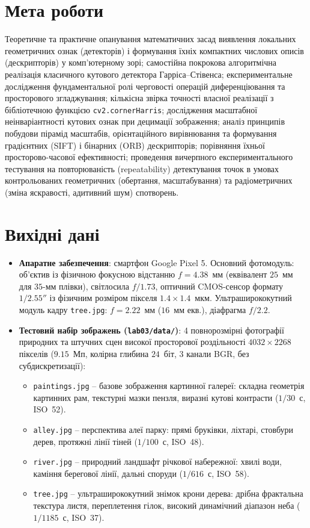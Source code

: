 \documentclass[14pt, a4paper]{extarticle}
\begin{document}


\section{Мета роботи}
Теоретичне та практичне опанування математичних засад виявлення локальних геометричних ознак (детекторів) і формування їхніх компактних числових описів (дескрипторів) у комп'ютерному зорі; самостійна покрокова алгоритмічна реалізація класичного кутового детектора Гарріса--Стівенса; експериментальне дослідження фундаментальної ролі черговості операцій диференціювання та просторового згладжування; кількісна звірка точності власної реалізації з бібліотечною функцією \texttt{cv2.cornerHarris}; дослідження масштабної неінваріантності кутових ознак при децимації зображення; аналіз принципів побудови пірамід масштабів, орієнтаційного вирівнювання та формування градієнтних (SIFT) і бінарних (ORB) дескрипторів; порівняння їхньої просторово-часової ефективності; проведення вичерпного експериментального тестування на повторюваність (repeatability) детектування точок в умовах контрольованих геометричних (обертання, масштабування) та радіометричних (зміна яскравості, адитивний шум) спотворень.

\section{Вихідні дані}
\begin{itemize}
    \item \textbf{Апаратне забезпечення}: смартфон Google Pixel 5. Основний фотомодуль: об'єктив із фізичною фокусною відстанню $f = 4.38$~мм (еквівалент $25$~мм для $35$-мм плівки), світлосила $f/1.73$, оптичний CMOS-сенсор формату $1/2.55''$ із фізичним розміром пікселя $1.4 \times 1.4$~мкм. Ультраширококутний модуль кадру \texttt{tree.jpg}: $f = 2.22$~мм ($16$~мм екв.), діафрагма $f/2.2$.
    \item \textbf{Тестовий набір зображень (\texttt{lab03/data/})}: 4 повнорозмірні фотографії природних та штучних сцен високої просторової роздільності $4032 \times 2268$ пікселів ($9.15$~Мп, колірна глибина $24$~біт, 3 канали BGR, без субдискретизації):
    \begin{itemize}
        \item \texttt{paintings.jpg} -- базове зображення картинної галереї: складна геометрія картинних рам, текстурні мазки пензля, виразні кутові контрасти ($1/30$~с, ISO~52).
        \item \texttt{alley.jpg} -- перспектива алеї парку: прямі бруківки, ліхтарі, стовбури дерев, протяжні лінії тіней ($1/100$~с, ISO~48).
        \item \texttt{river.jpg} -- природний ландшафт річкової набережної: хвилі води, каміння берегової лінії, дальні споруди ($1/616$~с, ISO~58).
        \item \texttt{tree.jpg} -- ультраширококутний знімок крони дерева: дрібна фрактальна текстура листя, переплетення гілок, високий динамічний діапазон неба ($1/1185$~с, ISO~37).
    \end{itemize}
\end{itemize}
\end{document}
